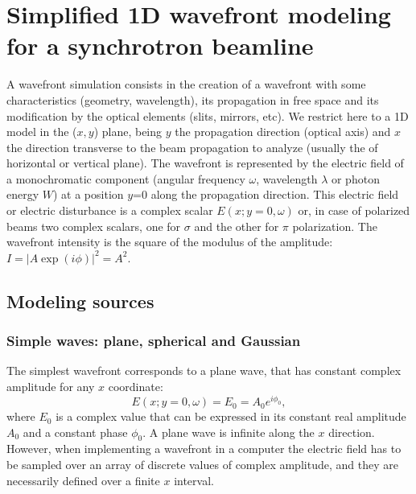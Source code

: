 \documentclass[]{spie}  %
\begin{document}
\section{Simplified 1D wavefront modeling for a synchrotron beamline}


A wavefront simulation consists in the creation of a wavefront with some characteristics (geometry, wavelength), its propagation in free space and its modification by the optical elements (slits, mirrors, etc). We restrict here to a 1D model in the ($x,y$) plane, being $y$ the propagation direction (optical axis) and $x$ the direction transverse to the beam propagation to analyze (usually the of horizontal or vertical plane). The wavefront is represented by the electric field of a monochromatic component (angular frequency $\omega$, wavelength $\lambda$ or photon energy $W$) at a position $y$=0 along the propagation direction. This electric field or electric disturbance is a complex scalar $E(x;y=0,\omega)$ or, in case of polarized beams two complex scalars, one for $\sigma$ and the other for $\pi$ polarization. The wavefront intensity is the square of the modulus of the amplitude: $I=|A \exp{(i\phi)}|^2=A^2$. 

\subsection{Modeling sources}
\label{sec:sources}

\subsubsection{Simple waves: plane, spherical and Gaussian}

The simplest wavefront corresponds to a plane wave, that has constant complex amplitude for any $x$ coordinate: 
\begin{equation}
   E(x;y=0,\omega)=E_0=A_0 e^{i \phi_0},
\end{equation}
where $E_0$ is a complex value that can be expressed in its constant real  amplitude $A_0$ and a constant phase $\phi_0$. A plane wave is infinite along the $x$ direction. However, when implementing a wavefront in a computer the electric field has to be sampled over an array of discrete values of complex amplitude, and they are necessarily defined over a finite $x$ interval. 
\end{document}
